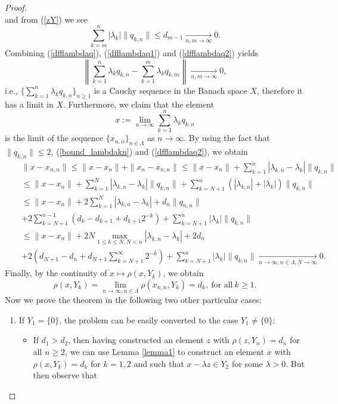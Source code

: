 \documentclass[10pt,a4paper]{amsart}
\begin{document}
\begin{proof}
\begin{equation}
\end{equation}
and  from (\ref{zY}) we see
\begin{equation}
\label{dfflambdaq2}
\sum_{k=m}^n|\lambda_k|\|q_{k,n}\|\le d_{m-1}\xrightarrow[n,m\rightarrow\infty]{}0.
\end{equation}
Combining (\ref{dfflambdaq}), (\ref{dfflambdaq1}) and (\ref{dfflambdaq2}) yields
$$
\left\|\sum_{k=1}^n\lambda_{k}q_{k,n}-\sum_{k=1}^m\lambda_{k}q_{k,m}\right\|\xrightarrow[n,m\rightarrow\infty]{}0,
$$
i.e., $\Big\{\sum\limits_{k=1}^n\lambda_kq_{k,n}\Big\}_{n\ge1}$ is a Cauchy sequence in the Banach space $X$, therefore it has a limit in $X$.
Furthermore, we claim that the element
$$
x:=\lim_{n\rightarrow\infty}\sum_{k=1}^n\lambda_kq_{k,n}
$$
is the limit of the sequence $\{x_{n,n}\}_{n\in\Lambda}$ as $n\to\infty$. By using the fact that
$\|q_{k,n}\|\le 2$, (\ref{bound_lambdakn}) and (\ref{dfflambdaq2}), we obtain
\begin{eqnarray*}
&&\|x-x_{n,n}\|\le \|x-x_n\|+\|x_n-x_{n,n}\|\le \|x-x_n\|+\sum_{k=1}^n|\lambda_{k,n}-\lambda_k|\|q_{k,n}\|\\
&&\le \|x-x_n\|+\sum_{k=1}^{N}|\lambda_{k,n}-\lambda_k|\|q_{k,n}\|+\sum_{k=N+1}^n(|\lambda_{k,n}|+|\lambda_k|)\|q_{k,n}\|\\
&&\le \|x-x_n\|+2\sum_{k=1}^{N}|\lambda_{k,n}-\lambda_k|+d_{n}\|q_{n,n}\|\\
&&+2\sum_{k=N+1}^{n-1}\left(d_k-d_{k+1}+d_{k+1}2^{-k}\right)+\sum_{k=N+1}^n|\lambda_k|\|q_{k,n}\|\\
&&\le \|x-x_n\|+2 N\max_{1\le k\le N,N<n}|\lambda_{k,n}-\lambda_k|+2d_n\\
&&+2\left(d_{N+1}-d_n+d_{N+1}\sum_{k=N+1}^{\infty}2^{-k}\right)+\sum_{k=N+1}^n|\lambda_k|\|q_{k,n}\|\xrightarrow[n\rightarrow\infty,n\in\Lambda,N\rightarrow\infty]{}0.
\end{eqnarray*}
Finally, by the continuity of $x\longmapsto\rho(x,Y_k)$, we obtain
$$
\rho(x,Y_k)=\lim_{n\rightarrow\infty,n\in\Lambda}\rho(x_{n,n},Y_k)=d_k,~\mbox{for all}~k\ge1.
$$
Now we prove the theorem in the following two other particular cases:
\begin{enumerate}
\item If $Y_1=\{0\}$, the problem can be easily converted to the case $Y_1\neq\{0\}$:
\begin{itemize}
\item If $d_1>d_2$, then having constructed an element $z$ with $\rho(z,Y_n)=d_n$ for all $n\ge 2$, we can use Lemma \ref{lemma1} to construct an element $x$ with $\rho(x,Y_k)=d_k$ for $k=1,2$ and such that $x-\lambda z\in Y_{2}$ for some $\lambda>0$. But then observe that

\end{itemize}
\end{enumerate}
\end{proof}
\end{document}
